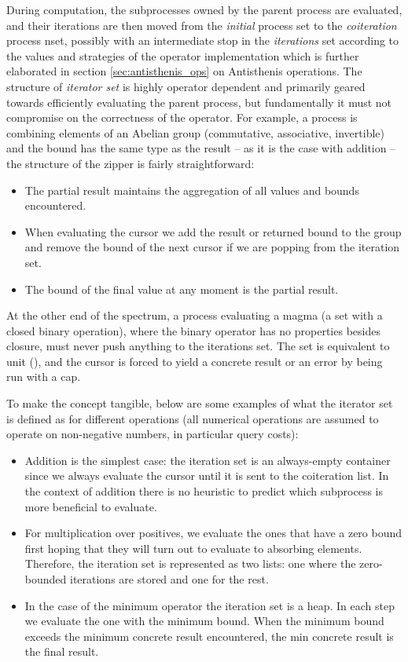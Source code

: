 During computation, the subprocesses owned by the parent process are
evaluated, and their iterations are then moved from the \emph{initial}
process set to the \emph{coiteration} process nset, possibly with an
intermediate stop in the \emph{iterations} set according to the values
and strategies of the operator implementation which is further
elaborated in section \ref{sec:antisthenis_ops} on Antisthenis
operations. The structure of \emph{iterator set} is highly operator
dependent and primarily geared towards efficiently evaluating the
parent process, but fundamentally it must not compromise on the
correctness of the operator. For example, a process is combining
elements of an Abelian group (commutative, associative, invertible)
and the bound has the same type as the result -- as it is the case
with addition -- the structure of the zipper is fairly
straightforward:

\begin{itemize}
\item The partial result maintains the aggregation of all values and
  bounds encountered.
\item When evaluating the cursor we add the result or returned bound to the group and
  remove the bound of the next cursor if we are popping from the
  iteration set.
\item The bound of the final value at any moment is the partial
  result.
\end{itemize}

At the other end of the spectrum, a process evaluating a magma (a set
with a closed binary operation), where the binary operator has no
properties besides closure, must never push anything to the iterations
set. The set is equivalent to unit (\hask{()}), and the cursor is
forced to yield a concrete result or an error by being run with a
 cap.

To make the concept tangible, below are some examples of what the iterator set is
defined as for different operations (all numerical operations are
assumed to operate on non-negative numbers, in particular query
costs):

\begin{itemize}
\item Addition is the simplest case: the iteration set is an
  always-empty container since we always evaluate the cursor until it
  is sent to the coiteration list. In the context of addition there is
  no heuristic to predict which subprocess is more beneficial to
  evaluate.
\item For multiplication over positives, we evaluate the ones
  that have a zero bound first hoping that they will turn out to
  evaluate to absorbing elements. Therefore, the iteration set is
  represented as two lists: one where the zero-bounded iterations
  are stored and one for the rest.
\item In the case of the minimum operator the iteration set is a heap. In each step we
  evaluate the one with the minimum bound. When the minimum
  bound exceeds the minimum concrete result encountered, the min concrete
  result is the final result.
\end{itemize}

